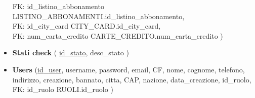 \begin{itemize}
    FK: id{\_}listino{\_}abbonamento \textrightarrow LISTINO{\_}ABBONAMENTI.id{\_}listino{\_}abbonamento,\\
    FK: id{\_}city{\_}card \textrightarrow CITY{\_}CARD.id{\_}city{\_}card,\\
    FK: num{\_}carta{\_}credito \textrightarrow CARTE{\_}CREDITO.num{\_}carta{\_}credito
    )
    \item 
    \textbf{Stati check}
    (
    \underline{id{\_}stato},
    desc{\_}stato
    )
    \item 
    \textbf{Users}
    (\underline{id{\_}user},
    username,
    password,
    email,
    CF,
    nome,
    cognome,
    telefono,
    indirizzo,
    creazione,
    bannato,
    citta,
    CAP,
    nazione,
    data{\_}creazione,
    id{\_}ruolo, \\
    FK: id{\_}ruolo \textrightarrow RUOLI.id{\_}ruolo
    )
\end{itemize}


